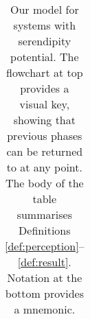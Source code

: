 \begin{table}[h]
{}

\begin{tabular}{p{}p{}}
\caption{Our model for systems with serendipity potential. The flowchart at top provides a visual key, showing that previous phases can be returned to at any point.  The body of the table summarises Definitions \ref{def:perception}--\ref{def:result}.  Notation at the bottom provides a mnemonic.\label{tab:model-summary-table}}
\end{tabular}
\end{table}
